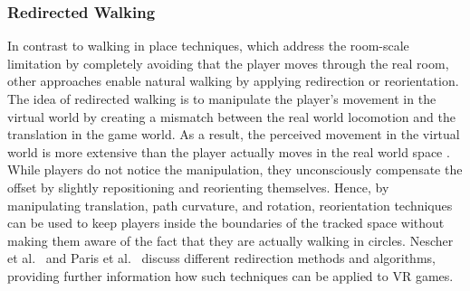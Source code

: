 



\subsubsection{Redirected Walking}
In contrast to walking in place techniques, which address the room-scale limitation by completely avoiding that the player moves through the real room, other approaches enable natural walking by applying redirection or reorientation. 
The idea of redirected walking is to manipulate the player's movement in the virtual world by creating a mismatch between the real world locomotion and the translation in the game world. As a result, the perceived movement in the virtual world is more extensive than the player actually moves in the real world space \cite{razzaque2001redirected, razzaque2005redirected,steinicke2010}. %
While players do not notice the manipulation, they unconsciously compensate the offset by slightly repositioning and reorienting themselves. Hence, by manipulating translation, path curvature, and rotation, reorientation techniques can be used to keep players inside the boundaries of the tracked space without making them aware of the fact that they are actually walking in circles. 
Nescher et al.~\cite{nescher2014} and Paris et al.~\cite{paris2017} discuss different redirection methods and algorithms, providing further information how such techniques can be applied to VR games.

